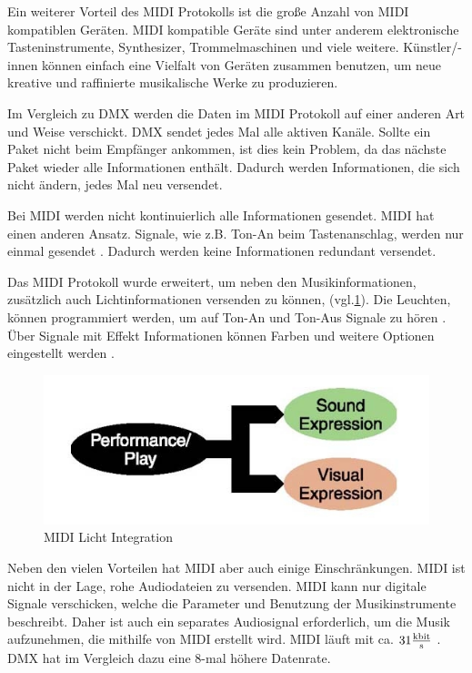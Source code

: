 Ein weiterer Vorteil des MIDI Protokolls ist die große Anzahl von MIDI kompatiblen Geräten. MIDI kompatible Geräte sind unter anderem elektronische Tasteninstrumente, Synthesizer, Trommelmaschinen und viele weitere. Künstler/-innen können einfach eine Vielfalt von Geräten zusammen benutzen, um neue kreative und raffinierte musikalische Werke zu produzieren.

Im Vergleich zu DMX werden die Daten im MIDI Protokoll auf einer anderen Art und Weise verschickt. DMX sendet jedes Mal alle aktiven Kanäle. Sollte ein Paket nicht beim Empfänger ankommen, ist dies kein Problem, da das nächste Paket wieder alle Informationen enthält. Dadurch werden Informationen, die sich nicht ändern, jedes Mal neu versendet.

Bei MIDI werden nicht kontinuierlich alle Informationen gesendet. MIDI hat einen anderen Ansatz. Signale, wie z.B. Ton-An beim Tastenanschlag, werden nur einmal gesendet \cite[S.3]{MIDI-DETAILED-SPECIFICATION}. Dadurch werden keine Informationen redundant versendet.

Das MIDI Protokoll wurde erweitert, um neben den Musikinformationen, zusätzlich auch Lichtinformationen versenden zu können, \cite[S.1]{MIDI-Visual-Control} (vgl.\ref{fig:Midi_Light_Integration}). Die Leuchten, können programmiert werden, um auf Ton-An und Ton-Aus Signale zu hören \cite[S.4]{MIDI-Visual-Control}. Über Signale mit Effekt Informationen können Farben und weitere Optionen eingestellt werden \cite[S.6, ch. 2.2.1.2]{MIDI-Visual-Control}. 

\begin{figure}[H]
	\centering
	\includegraphics[width=.6\linewidth]{Pictures/MidiVisual}
	\caption{MIDI Licht Integration \cite[S. 1]{MIDI-Visual-Control}}
	\label{fig:Midi_Light_Integration}
\end{figure}


Neben den vielen Vorteilen hat MIDI aber auch einige Einschränkungen. MIDI ist nicht in der Lage, rohe Audiodateien zu versenden. MIDI kann nur digitale Signale verschicken, welche die Parameter und Benutzung der Musikinstrumente beschreibt. Daher ist auch ein separates Audiosignal erforderlich, um die Musik aufzunehmen, die mithilfe von MIDI erstellt wird. MIDI läuft mit ca. $31 \frac{\SI{}{\kilo\bit}}{\SI{}{\s}}$ \cite[S. 1]{MIDI-DETAILED-SPECIFICATION}. DMX hat im Vergleich dazu eine 8-mal höhere Datenrate. 

